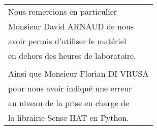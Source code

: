 \mbox{~}
\vfill
\hfill
\begin{tabular}{@{}l@{}}
  Nous remercions en particulier \\
  Monsieur David ARNAUD de nous \\
  avoir permis d'utiliser le matériel \\
  en dehors des heures de laboratoire. \\ \\

  Ainsi que Monsieur Florian DI VRUSA \\
  pour nous avoir indiqué une erreur \\
  au niveau de la prise en charge de \\
  la librairie Sense HAT en Python.
\end{tabular}
\setcounter{page}{0}
\thispagestyle{empty}